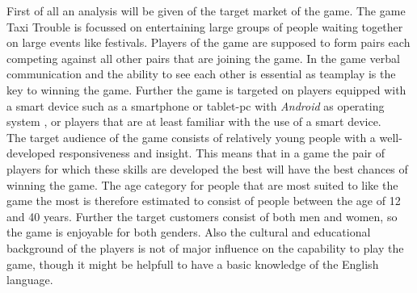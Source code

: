 First of all an analysis will be given of the target market of the game. The game Taxi Trouble is focussed on entertaining large groups of people waiting together on large events like festivals. Players of the game are supposed to form pairs each competing against all other pairs that are joining the game. In the game verbal communication and the ability to see each other is essential as teamplay is the key to winning the game. Further the game is targeted on players equipped with a smart device such as a smartphone or tablet-pc with \textit{Android} as operating system , or players that are at least familiar with the use of a smart device.\\
The target audience of the game consists of relatively young people with a well-developed responsiveness and insight. This means that in a game the pair of players for which these skills are developed the best will have the best chances of winning the game. The age category for people that are most suited to like the game the most is therefore estimated to consist of people between the age of 12 and 40 years. Further the target customers consist of both men and women, so the game is enjoyable for both genders. Also the cultural and educational background of the players is not of major influence on the capability to play the game, though it might be helpfull to have a basic knowledge of the English language.
     